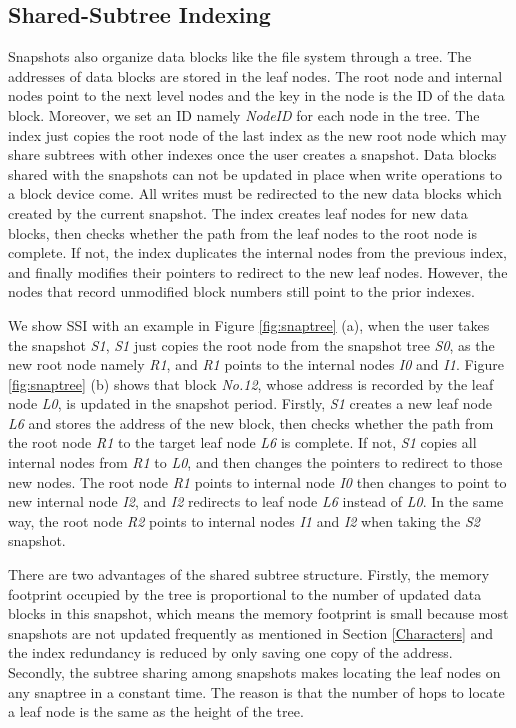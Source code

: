 \documentclass[sigconf, nonacm]{acmart}
\begin{document}
\subsection{Shared-Subtree Indexing}
\label{SSI}
Snapshots also organize data blocks like the file system through a tree. The addresses of data blocks are stored in the leaf nodes. The root node and internal nodes point to the next level nodes and the key in the node is the ID of the data block. Moreover, we set an ID namely \emph{NodeID} for each node in the tree. 
The index just copies the root node of the last index as the new root node which may share subtrees with other indexes once the user creates a snapshot.
Data blocks shared with the snapshots can not be updated in place when write operations to a block device come.  All writes must be redirected to the new data blocks which created by the current snapshot. The index creates leaf nodes for new data blocks, then checks whether the path from the leaf nodes to the root node is complete. If not, the index duplicates the internal nodes from the previous index, and finally modifies their pointers to redirect to the new leaf nodes. However, the nodes that record unmodified block numbers still point to the prior indexes.  


We show SSI with an example in Figure \ref{fig:snaptree} (a), when the user takes the snapshot \emph{S1}, \emph{S1} just copies the root node from the snapshot tree \emph{S0}, as the new root node namely \emph{R1}, and \emph{R1} points to the internal nodes \emph{I0} and \emph{I1}. 
Figure \ref{fig:snaptree} (b) shows that block \emph{No.12}, whose address is recorded by the leaf node \emph{L0}, is updated in the snapshot period. Firstly, \emph{S1} creates a new leaf node \emph{L6} and stores the address of the new block, then checks whether the path from the root node \emph{R1} to the target leaf node \emph{L6} is complete. If not, \emph{S1} copies all internal nodes from \emph{R1} to \emph{L0}, and then changes the pointers to redirect to those new nodes. The root node \emph{R1} points to internal node \emph{I0} then changes to point to new internal node \emph{I2}, and \emph{I2} redirects to leaf node \emph{L6} instead of \emph{L0}. In the same way, the root node \emph{R2} points to internal nodes \emph{I1} and \emph{I2} when taking the \emph{S2} snapshot.

There are two advantages of the shared subtree structure. Firstly, the memory footprint occupied by the tree is proportional to the number of updated data blocks in this snapshot, which means the memory footprint is small because most snapshots are not updated frequently as mentioned in Section \ref{Characters} and the index redundancy is reduced by only saving one copy of the address. Secondly, 
the subtree sharing among snapshots makes locating the leaf nodes on any snaptree in a constant time. The reason is that the number of hops to locate a leaf node is the same as the height of the tree.
\end{document}
